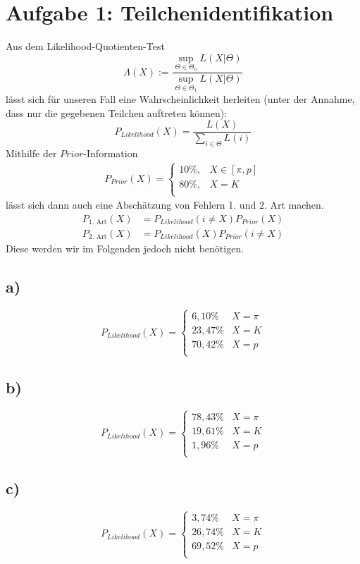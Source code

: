 \section*{Aufgabe 1: Teilchenidentifikation}
\label{sec:Aufgabe1}
Aus dem Likelihood-Quotienten-Test
\begin{equation}
    \Lambda(X):=\frac{\sup_{\Theta\in\Theta_0}L(X|\Theta)}{\sup_{\Theta\in\Theta_1}L(X|\Theta)}
\end{equation}
lässt sich für unseren Fall eine Wahrscheinlichkeit herleiten (unter der Annahme, dass nur die gegebenen Teilchen auftreten können):
\begin{equation}
    P_{Likelihood}(X)=\frac{L(X)}{\sum_{i\in\Theta}L(i)}
\end{equation}
Mithilfe der $Prior$-Information
\begin{align}
    P_{Prior}(X)=\begin{cases}
        10\%, & X\in[\pi,p] \\
        80\%, & X = K\\
    \end{cases}
\end{align}
lässt sich dann auch eine Abschätzung von Fehlern 1. und 2. Art machen.
\begin{align}
    P_{\text{1. Art}}(X)&=P_{Likelihood}(i\neq X)P_{Prior}(X)\nonumber\\
    P_{\text{2. Art}}(X)&=P_{Likelihood}(X)P_{Prior}(i\neq X)
\end{align}
Diese werden wir im Folgenden jedoch nicht benötigen.

\subsection*{a)}
\begin{equation}
    P_{Likelihood}(X)=\begin{cases}
        6,10\%   & X=\pi\\
        23,47\%  & X=K\\
        70,42\%  & X=p\\
    \end{cases}
\end{equation}

\subsection*{b)}
\begin{equation}
    P_{Likelihood}(X)=\begin{cases}
        78,43\%   & X=\pi\\
        19,61\%   & X=K\\
        1,96\%    & X=p\\
    \end{cases}
\end{equation}

\subsection*{c)}
\begin{equation}
    P_{Likelihood}(X)=\begin{cases}
        3,74\%   & X=\pi\\
        26,74\%  & X=K\\
        69,52\%  & X=p\\
    \end{cases}
\end{equation}